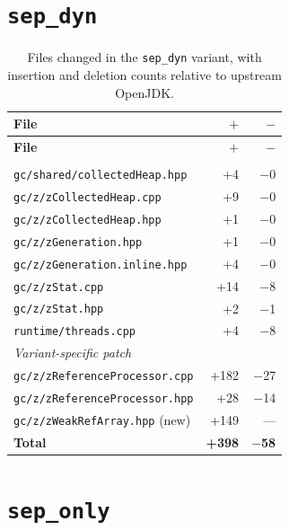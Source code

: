 \section{\texttt{sep\_dyn}}

\begin{longtable}[c]{lrr}
\caption[File changes in \texttt{sep\_dyn}]{Files changed in the \texttt{sep\_dyn} variant, with insertion and deletion counts relative to upstream OpenJDK.} \label{tab:patch-sep-dyn} \\
\toprule
\textbf{File} & \textbf{$+$} & \textbf{$-$} \\
\midrule
\endfirsthead
\toprule
\textbf{File} & \textbf{$+$} & \textbf{$-$} \\
\midrule
\endhead
\bottomrule
\endfoot
\multicolumn{3}{l}{\textit{Base patch}} \\
\texttt{gc/shared/collectedHeap.hpp}     & +4  & $-$0 \\
\texttt{gc/z/zCollectedHeap.cpp}         & +9  & $-$0 \\
\texttt{gc/z/zCollectedHeap.hpp}         & +1  & $-$0 \\
\texttt{gc/z/zGeneration.hpp}            & +1  & $-$0 \\
\texttt{gc/z/zGeneration.inline.hpp}     & +4  & $-$0 \\
\texttt{gc/z/zStat.cpp}                  & +14 & $-$8 \\
\texttt{gc/z/zStat.hpp}                  & +2  & $-$1 \\
\texttt{runtime/threads.cpp}             & +4  & $-$8 \\
\multicolumn{3}{l}{\textit{Variant-specific patch}} \\
\texttt{gc/z/zReferenceProcessor.cpp}   & +182 & $-$27 \\
\texttt{gc/z/zReferenceProcessor.hpp}   & +28  & $-$14 \\
\texttt{gc/z/zWeakRefArray.hpp} (new)   & +149 & --- \\
\midrule
\textbf{Total} & \textbf{+398} & \textbf{$-$58} \\
\end{longtable}

\section{\texttt{sep\_only}}

